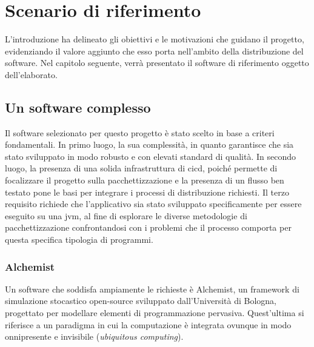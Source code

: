 
\chapter{Scenario di riferimento}\label{chap:scenery}

L'introduzione ha delineato gli obiettivi e le motivazioni che guidano il progetto, evidenziando il valore aggiunto che esso porta nell'ambito della distribuzione del software. Nel capitolo seguente, verrà presentato il software di riferimento oggetto dell'elaborato.

\section{Un software complesso}\label{sec:alchemist}
Il software selezionato per questo progetto è stato scelto in base a criteri fondamentali. In primo luogo, la sua complessità, in quanto garantisce che sia stato sviluppato in modo robusto e con elevati standard di qualità. In secondo luogo, la presenza di una solida infrastruttura di \ac{cicd}, poiché permette di focalizzare il progetto sulla pacchettizzazione e la presenza di un flusso ben testato pone le basi per integrare i processi di distribuzione richiesti. Il terzo requisito richiede che l'applicativo sia stato sviluppato specificamente per essere eseguito su una \ac{jvm}, al fine di esplorare le diverse metodologie di pacchettizzazione confrontandosi con i problemi che il processo comporta per questa specifica tipologia di programmi.

\subsection{Alchemist}

Un software che soddisfa ampiamente le richieste è Alchemist\cite{Pianini_2013}, un framework di simulazione stocastico open-source sviluppato dall'Università di Bologna, progettato per modellare elementi di programmazione pervasiva. Quest'ultima si riferisce a un paradigma in cui la computazione è integrata ovunque in modo onnipresente e invisibile (\textit{ubiquitous computing}). 


